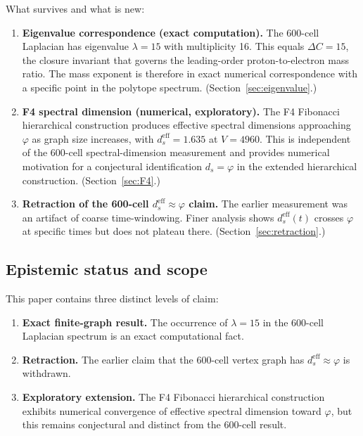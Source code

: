 \documentclass[12pt]{article}
\newcommand{\phig}{\varphi}
\newcommand{\ds}{d_s}
\newcommand{\dseff}{d_s^{\mathrm{eff}}}
\begin{document}
What survives and what is new:

\begin{enumerate}
    \item \textbf{Eigenvalue correspondence (exact computation).} The 600-cell Laplacian has eigenvalue $\lambda = 15$ with multiplicity 16. This equals $\Delta C = 15$, the closure invariant that governs the leading-order proton-to-electron mass ratio. The mass exponent is therefore in exact numerical correspondence with a specific point in the polytope spectrum. (Section~\ref{sec:eigenvalue}.)

    \item \textbf{F4 spectral dimension (numerical, exploratory).} The F4 Fibonacci hierarchical construction produces effective spectral dimensions approaching $\phig$ as graph size increases, with $\dseff = 1.635$ at $V = 4960$. This is independent of the 600-cell spectral-dimension measurement and provides numerical motivation for a conjectural identification $\ds = \phig$ in the extended hierarchical construction. (Section~\ref{sec:F4}.)

    \item \textbf{Retraction of the 600-cell $\dseff \approx \phig$ claim.} The earlier measurement was an artifact of coarse time-windowing. Finer analysis shows $\dseff(t)$ crosses $\phig$ at specific times but does not plateau there. (Section~\ref{sec:retraction}.)
\end{enumerate}

\subsection*{Epistemic status and scope}

This paper contains three distinct levels of claim:

\begin{enumerate}
    \item \textbf{Exact finite-graph result.} The occurrence of $\lambda = 15$ in the 600-cell Laplacian spectrum is an exact computational fact.
    \item \textbf{Retraction.} The earlier claim that the 600-cell vertex graph has $\dseff \approx \phig$ is withdrawn.
    \item \textbf{Exploratory extension.} The F4 Fibonacci hierarchical construction exhibits numerical convergence of effective spectral dimension toward $\phig$, but this remains conjectural and distinct from the 600-cell result.
\end{enumerate}
\end{document}
